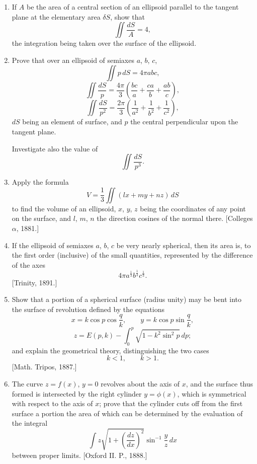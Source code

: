 \documentclass[11pt, a4paper]{article}
\newcommand{\source}[1]{\hfill\textnormal{[#1]}}
\begin{document}
\begin{enumerate}[leftmargin=2em]

\item[7.] If $A$ be the area of a central section of an ellipsoid parallel to the tangent plane at the elementary area $\delta S$, show that
\[
\iint\frac{dS}{A}=4,
\]
the integration being taken over the surface of the ellipsoid.

\item[8.] Prove that over an ellipsoid of semiaxes $a$, $b$, $c$,
\[
\iint p\,dS=4\pi abc,
\]
\[
\iint\frac{dS}{p}
=
\frac{4\pi}{3}
\left(\frac{bc}{a}+\frac{ca}{b}+\frac{ab}{c}\right),
\]
\[
\iint\frac{dS}{p^2}
=
\frac{2\pi}{3}
\left(\frac{1}{a^2}+\frac{1}{b^2}+\frac{1}{c^2}\right),
\]
$dS$ being an element of surface, and $p$ the central perpendicular upon the tangent plane.

Investigate also the value of
\[
\iint\frac{dS}{p^3}.
\]

\item[9.] Apply the formula
\[
V=\frac13\iint(lx+my+nz)\,dS
\]
to find the volume of an ellipsoid, $x$, $y$, $z$ being the coordinates of any point on the surface, and $l$, $m$, $n$ the direction cosines of the normal there.
\source{Colleges $\alpha$, 1881.}

\item[10.] If the ellipsoid of semiaxes $a$, $b$, $c$ be very nearly spherical, then its area is, to the first order (inclusive) of the small quantities, represented by the difference of the axes
\[
4\pi a^{\frac13}b^{\frac13}c^{\frac13}.
\]
\source{Trinity, 1891.}

\item[11.] Show that a portion of a spherical surface (radius unity) may be bent into the surface of revolution defined by the equations
\[
x=k\cos p\cos\frac{q}{k},\qquad
y=k\cos p\sin\frac{q}{k},
\]
\[
z=E(p,k)-\int_0^p\sqrt{1-k^2\sin^2p}\,dp;
\]
and explain the geometrical theory, distinguishing the two cases
\[
k<1,\qquad k>1.
\]
\source{Math. Tripos, 1887.}

\item[12.] The curve $z=f(x)$, $y=0$ revolves about the axis of $x$, and the surface thus formed is intersected by the right cylinder $y=\phi(x)$, which is symmetrical with respect to the axis of $x$; prove that the cylinder cuts off from the first surface a portion the area of which can be determined by the evaluation of the integral
\[
\int z\sqrt{1+\left(\frac{dz}{dx}\right)^2}\sin^{-1}\frac{y}{z}\,dx
\]
between proper limits.
\source{Oxford II. P., 1888.}


\end{enumerate}
\end{document}
